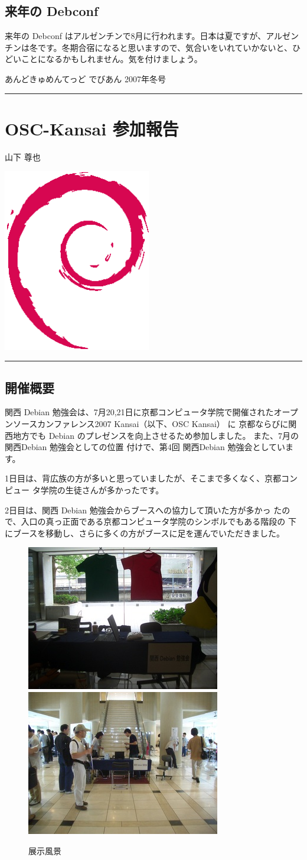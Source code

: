 \documentclass[mingoth,a4paper]{jsarticle}
\renewcommand{\dancersection}[2]{%
\newpage
あんどきゅめんてっど でびあん 2007年冬号
%
\vspace{0.1mm}\\
{\color{dancerlightblue}\rule{\hsize}{2mm}}

%
%
\begin{minipage}[t]{0.7\hsize}
\color{dancerdarkblue}
\vspace{1cm}
\section{#1}
\hfill{}#2\\
\end{minipage}
\begin{minipage}[t]{0.3\hsize}
\vspace{-2cm}
\hfill{}\includegraphics[height=8cm]{image200502/openlogo-nd.eps}\\
\vspace{-5cm}
\end{minipage}
%
%
{\color{dancerdarkblue}\rule{0.74\hsize}{2mm}}
%
\vspace{2cm}
}
\begin{document}
\subsection{来年の Debconf}

来年の Debconf はアルゼンチンで8月に行われます。日本は夏ですが、アルゼン
チンは冬です。冬期合宿になると思いますので、気合いをいれていかないと、ひ
どいことになるかもしれません。気を付けましょう。

\dancersection{OSC-Kansai 参加報告}{山下 尊也}
\label{sec:osckansai2007}

\subsection{開催概要}
関西 Debian 勉強会は、7月20,21日に京都コンピュータ学院で開催されたオープ
ンソースカンファレンス2007 Kansai（以下、OSC Kansai） に 京都ならびに関
西地方でも Debian のプレゼンスを向上させるため参加しました。
また、7月の関西Debian 勉強会としての位置
付けで、第4回 関西Debian 勉強会としています。

1日目は、背広族の方が多いと思っていましたが、そこまで多くなく、京都コンピュー
タ学院の生徒さんが多かったです。

2日目は、関西 Debian 勉強会からブースへの協力して頂いた方が多かっ
たので、入口の真っ正面である京都コンピュータ学院のシンボルでもある階段の
下にブースを移動し、さらに多くの方がブースに足を運んでいただきました。

\begin{figure}[H]
 \includegraphics[width=0.5\hsize]{image200708/0720booth.jpg}
 \includegraphics[width=0.5\hsize]{image200708/0721booth.jpg}
\caption{展示風景}
\label{fig:osctenjifukei}
\end{figure}
\end{document}
